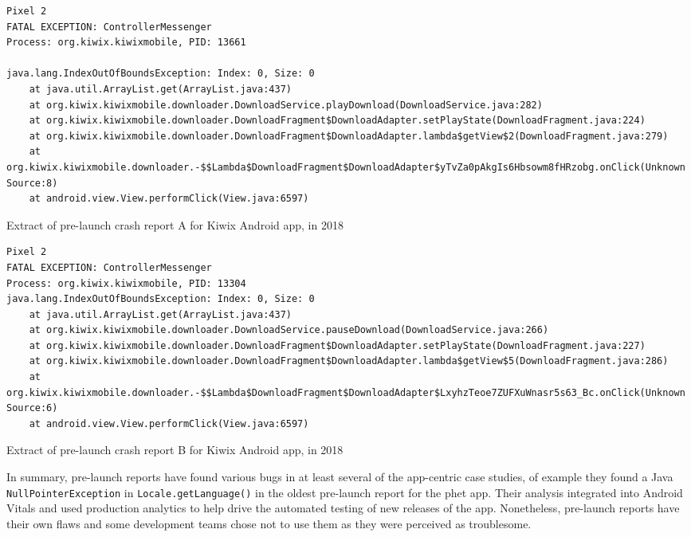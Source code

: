 \begin{listing}
\begin{verbatim}
Pixel 2
FATAL EXCEPTION: ControllerMessenger
Process: org.kiwix.kiwixmobile, PID: 13661

java.lang.IndexOutOfBoundsException: Index: 0, Size: 0
	at java.util.ArrayList.get(ArrayList.java:437)
	at org.kiwix.kiwixmobile.downloader.DownloadService.playDownload(DownloadService.java:282)
	at org.kiwix.kiwixmobile.downloader.DownloadFragment$DownloadAdapter.setPlayState(DownloadFragment.java:224)
	at org.kiwix.kiwixmobile.downloader.DownloadFragment$DownloadAdapter.lambda$getView$2(DownloadFragment.java:279)
	at org.kiwix.kiwixmobile.downloader.-$$Lambda$DownloadFragment$DownloadAdapter$yTvZa0pAkgIs6Hbsowm8fHRzobg.onClick(Unknown Source:8)
	at android.view.View.performClick(View.java:6597)

\end{verbatim}
\caption{Extract of pre-launch crash report A for Kiwix Android app, in 2018}
\label{listing:kiwix-pre-launch-report-crash-report-a}
\end{listing}


\begin{listing}
\begin{verbatim}
Pixel 2
FATAL EXCEPTION: ControllerMessenger
Process: org.kiwix.kiwixmobile, PID: 13304
java.lang.IndexOutOfBoundsException: Index: 0, Size: 0
	at java.util.ArrayList.get(ArrayList.java:437)
	at org.kiwix.kiwixmobile.downloader.DownloadService.pauseDownload(DownloadService.java:266)
	at org.kiwix.kiwixmobile.downloader.DownloadFragment$DownloadAdapter.setPlayState(DownloadFragment.java:227)
	at org.kiwix.kiwixmobile.downloader.DownloadFragment$DownloadAdapter.lambda$getView$5(DownloadFragment.java:286)
	at org.kiwix.kiwixmobile.downloader.-$$Lambda$DownloadFragment$DownloadAdapter$LxyhzTeoe7ZUFXuWnasr5s63_Bc.onClick(Unknown Source:6)
	at android.view.View.performClick(View.java:6597)
\end{verbatim}
\caption{Extract of pre-launch crash report B for Kiwix Android app, in 2018}
\label{listing:kiwix-pre-launch-report-crash-report-b}
\end{listing}

In summary, pre-launch reports have found various bugs in at least several of the app-centric case studies, of example they found a Java \texttt{NullPointerException} in \texttt{Locale.getLanguage()} in the oldest pre-launch report for the \gls{phet} app. Their analysis integrated into Android Vitals and used production analytics to help drive the automated testing of new releases of the app. Nonetheless, pre-launch reports have their own flaws and some development teams chose not to use them as they were perceived as troublesome. 

